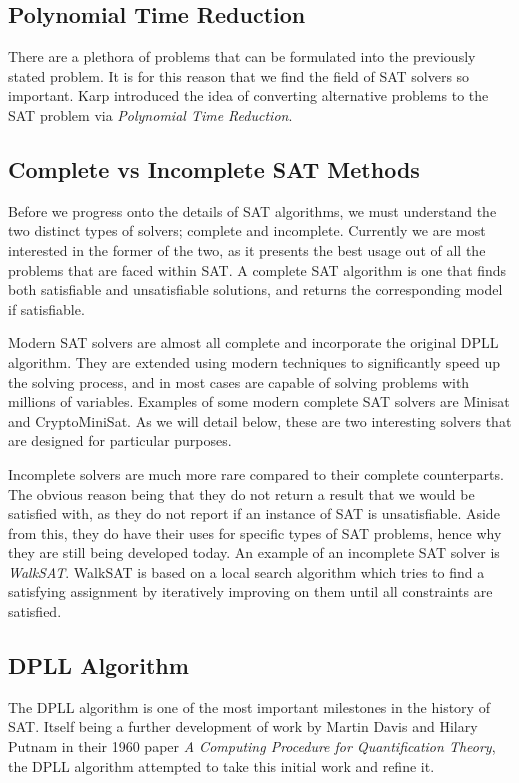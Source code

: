 \documentclass{article}
\begin{document}
\subsection{Polynomial Time Reduction}
There are a plethora of problems that can be formulated into the previously stated problem. It is
for this reason that we find the field of SAT solvers so important. Karp\cite{karp} introduced the idea of converting alternative
problems to the SAT problem via \textit{Polynomial Time Reduction}.

\subsection{Complete vs Incomplete SAT Methods}
Before we progress onto the details of SAT algorithms, we must understand the two distinct types of
solvers; complete and incomplete. Currently we are most interested in the former of the two, as it
presents the best usage out of all the problems that are faced within SAT. A complete SAT algorithm
is one that finds both satisfiable and unsatisfiable solutions, and returns the corresponding model
if satisfiable.

Modern SAT solvers are almost all complete and incorporate the original DPLL algorithm. They are extended using modern techniques
to significantly speed up the solving process, and in most cases are capable of solving problems with millions of variables.
Examples of some modern complete SAT solvers are Minisat and CryptoMiniSat. As we will detail below, these are two interesting
solvers that are designed for particular purposes.

Incomplete solvers are much more rare compared to their complete counterparts. The obvious reason being that they do not return a
result that we would be satisfied with, as they do not report if an instance of SAT is unsatisfiable. Aside from this, they do
have their uses for specific types of SAT problems, hence why they are still being developed today. An example of an incomplete
SAT solver is \textit{WalkSAT}. WalkSAT is based on a local search algorithm which tries to find a satisfying assignment by
iteratively improving on them until all constraints are satisfied.

\subsection{DPLL Algorithm}
The DPLL algorithm is one of the most important milestones in the history of SAT. Itself being a further development of work by
Martin Davis and Hilary Putnam in their 1960 paper \textit{A Computing Procedure for Quantification Theory}\cite{putnam}, the
DPLL algorithm attempted to take this initial work and refine it.
\end{document}
